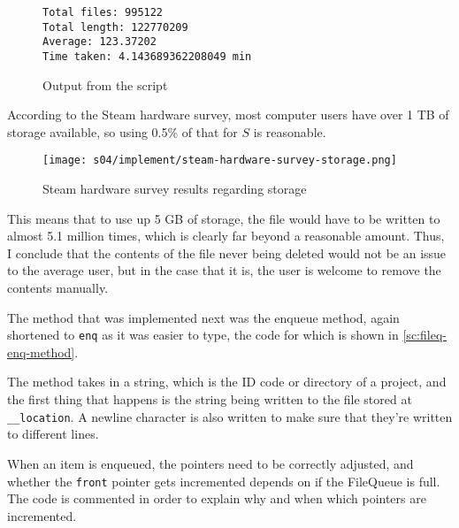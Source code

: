         \begin{figure}[!ht]
            \begin{verbatim}
Total files: 995122
Total length: 122770209
Average: 123.37202
Time taken: 4.143689362208049 min
            \end{verbatim}
            \caption{Output from the script}
            \label{fig:avg-filepath-output}
        \end{figure}

        According to the Steam hardware survey, most computer users have over 1 \si{TB} of storage available, so using 0.5\% of that for $S$ is reasonable. 

        \begin{figure}[!ht]
            \centering
            \texttt{[image: s04/implement/steam-hardware-survey-storage.png]}
            \caption{Steam hardware survey results regarding storage}
            \label{fig:steam-hw-survey-storage}
        \end{figure}

        This means that to use up 5 \si{GB} of storage, the file would have to be written to almost 5.1 million times, which is clearly far beyond a reasonable amount. 
        Thus, I conclude that the contents of the file never being deleted would not be an issue to the average user, but in the case that it is, the user is welcome to remove the contents manually. 



        The method that was implemented next was the enqueue method, again shortened to \verb|enq| as it was easier to type, the code for which is shown in \autoref{sc:fileq-enq-method}. 

        The method takes in a string, which is the ID code or directory of a project, and the first thing that happens is the string being written to the file stored at \verb|__location|. 
        A newline character is also written to make sure that they're written to different lines. 

        When an item is enqueued, the pointers need to be correctly adjusted, and whether the \verb|front| pointer gets incremented depends on if the FileQueue is full. 
        The code is commented in order to explain why and when which pointers are incremented. 


